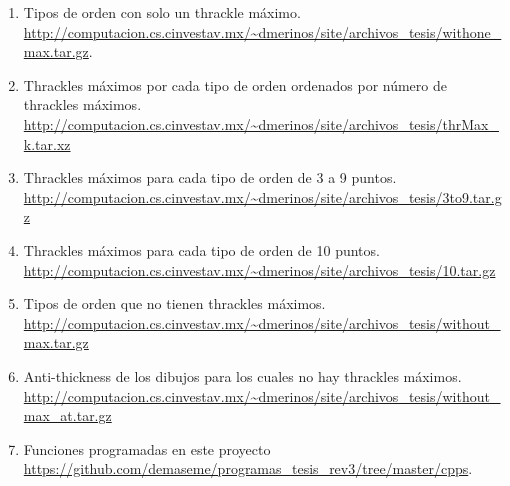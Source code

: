 \label{apendice-ligas}
\begin{enumerate}
  \item Tipos de orden con solo un thrackle máximo.
  \label{link-withone}
  \url{http://computacion.cs.cinvestav.mx/~dmerinos/site/archivos_tesis/withone_max.tar.gz}.
  \item Thrackles máximos por cada tipo de orden ordenados por número de thrackles máximos.
  \label{link-thrMax_k}
  \url{http://computacion.cs.cinvestav.mx/~dmerinos/site/archivos_tesis/thrMax_k.tar.xz}
  \item Thrackles máximos para cada tipo de orden de 3 a 9 puntos.
  \label{link-3to9}
  \url{http://computacion.cs.cinvestav.mx/~dmerinos/site/archivos_tesis/3to9.tar.gz}
  \item Thrackles máximos para cada tipo de orden de 10 puntos.
  \label{link-10}
  \url{http://computacion.cs.cinvestav.mx/~dmerinos/site/archivos_tesis/10.tar.gz}
  \item Tipos de orden que no tienen thrackles máximos.
  \label{link-thrWithoutMax}
  \url{http://computacion.cs.cinvestav.mx/~dmerinos/site/archivos_tesis/without_max.tar.gz}
  \item Anti-thickness de los dibujos para los cuales no hay thrackles máximos.
  \label{link-thrWithoutMax-at}
  \url{http://computacion.cs.cinvestav.mx/~dmerinos/site/archivos_tesis/without_max_at.tar.gz}
  \item Funciones programadas en este proyecto
  \label{link-github}
  \url{https://github.com/demaseme/programas_tesis_rev3/tree/master/cpps}.
\end{enumerate}
